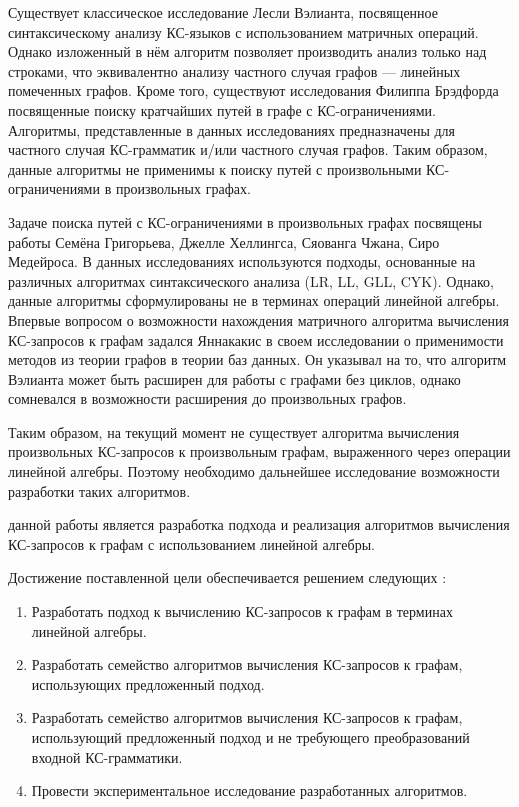 Существует классическое исследование Лесли Вэлианта, посвященное синтаксическому анализу КС-языков с использованием матричных операций. Однако изложенный в нём алгоритм позволяет производить анализ только над строками, что эквивалентно анализу частного случая графов --- линейных помеченных графов. Кроме того, существуют исследования Филиппа Брэдфорда посвященные поиску кратчайших путей в графе с КС-ограничениями. Алгоритмы, представленные в данных исследованиях предназначены для частного случая КС-грамматик и/или частного случая графов. Таким образом, данные алгоритмы не применимы к поиску путей с произвольными КС-ограничениями в произвольных графах.

Задаче поиска путей с КС-ограничениями в произвольных графах посвящены работы Семёна Григорьева, Джелле Хеллингса, Сяованга Чжана, Сиро Медейроса. В данных исследованиях используются подходы, основанные на различных алгоритмах синтаксического анализа (LR, LL, GLL, CYK). Однако, данные алгоритмы сформулированы не в терминах операций линейной алгебры. Впервые вопросом о возможности нахождения матричного алгоритма вычисления КС-запросов к графам задался Яннакакис в своем исследовании о применимости методов из теории графов в теории баз данных. Он указывал на то, что алгоритм Вэлианта может быть расширен для работы с графами без циклов, однако сомневался в возможности расширения до произвольных графов.

Таким образом, на текущий момент не существует алгоритма вычисления произвольных КС-запросов к произвольным графам, выраженного через операции линейной алгебры. Поэтому необходимо дальнейшее исследование возможности разработки таких алгоритмов.

{\aim} данной работы является разработка подхода и реализация алгоритмов вычисления КС-запросов к графам с использованием линейной алгебры.

Достижение поставленной цели обеспечивается решением следующих {\tasks}:
\begin{enumerate}[beginpenalty=10000] %
  \item Разработать подход к вычислению КС-запросов к графам в терминах линейной алгебры.
  \item Разработать семейство алгоритмов вычисления КС-запросов к графам, использующих предложенный подход.
  \item Разработать семейство алгоритмов вычисления КС-запросов к графам, использующий предложенный подход и не требующего преобразований входной КС-грамматики.
  \item Провести экспериментальное исследование разработанных алгоритмов.
\end{enumerate}


